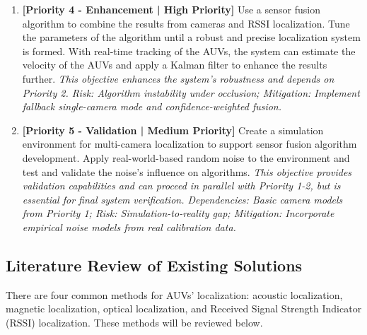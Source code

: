 \documentclass[11pt]{article}
\newcommand{\cn}[1]{\begin{CJK}{UTF8}{gbsn}#1\end{CJK}}
\newcommand{\yh}[1]{\noindent{\color{blue}\textbf{yh: }{\cn{#1}}}}
\begin{document}
\begin{enumerate}
        \item \textbf{[Priority 4 - Enhancement | High Priority]} Use a sensor fusion algorithm to combine the results from cameras and RSSI localization. Tune the parameters of the algorithm until a robust and precise localization system is formed. With real-time tracking of the AUVs, the system can estimate the velocity of the AUVs and apply a Kalman filter to enhance the results further. \textit{This objective enhances the system's robustness and depends on Priority 2. Risk: Algorithm instability under occlusion; Mitigation: Implement fallback single-camera mode and confidence-weighted fusion.}

        \item \textbf{[Priority 5 - Validation | Medium Priority]} Create a simulation environment for multi-camera localization to support sensor fusion algorithm development. Apply real-world-based random noise to the environment and test and validate the noise's influence on algorithms. \textit{This objective provides validation capabilities and can proceed in parallel with Priority 1-2, but is essential for final system verification. Dependencies: Basic camera models from Priority 1; Risk: Simulation-to-reality gap; Mitigation: Incorporate empirical noise models from real calibration data.}
    \end{enumerate}
    \subsection{Literature Review of Existing Solutions }
    There are four common methods for AUVs' localization: acoustic localization, magnetic localization, optical localization, and Received Signal Strength Indicator (RSSI) localization. These methods will be reviewed below.
\end{document}
